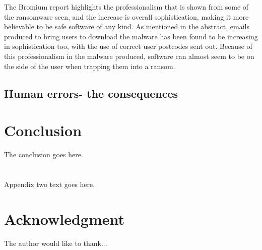 \documentclass[journal,comsoc]{IEEEtran}
\begin{document}
The Bromium report highlights the professionalism that is shown from some of the ransomware seen, and the increase is overall sophistication, making it more believable to be safe software of any kind. As mentioned in the abstract, emails produced to bring users to download the malware has been found to be increasing in sophistication too, with the use of correct user postcodes sent out. Because of this professionalism in the malware produced, software can almost seem to be on the side of the user when trapping them into a ransom. \par


\subsection{Human errors- the consequences}

\section{Conclusion}
The conclusion goes here.

\appendices

\section{}
Appendix two text goes here.
\section*{Acknowledgment}


The author would like to thank...

\ifCLASSOPTIONcaptionsoff
  \newpage
\fi

\end{document}
